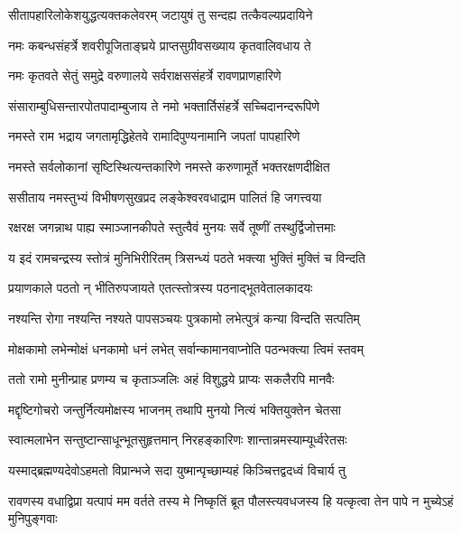 \twolineshloka
{सीतापहारिलोकेशयुद्धत्यक्तकलेवरम्}
{जटायुषं तु सन्दह्य तत्कैवल्यप्रदायिने}%

\twolineshloka
{नमः कबन्धसंहर्त्रे शवरीपूजिताङ्घ्रये}
{प्राप्तसुग्रीवसख्याय कृतवालिवधाय ते}%

\twolineshloka
{नमः कृतवते सेतुं समुद्रे वरुणालये}
{सर्वराक्षससंहर्त्रे रावणप्राणहारिणे}%

\twolineshloka
{संसाराम्बुधिसन्तारपोतपादाम्बुजाय ते}
{नमो भक्तार्तिसंहर्त्रे सच्चिदानन्दरूपिणे}%

\twolineshloka
{नमस्ते राम भद्राय जगतामृद्धिहेतवे}
{रामादिपुण्यनामानि जपतां पापहारिणे}%

\twolineshloka
{नमस्ते सर्वलोकानां सृष्टिस्थित्यन्तकारिणे}
{नमस्ते करुणामूर्ते भक्तरक्षणदीक्षित}%

\twolineshloka
{ससीताय नमस्तुभ्यं विभीषणसुखप्रद}
{लङ्केश्वरवधाद्राम पालितं हि जगत्त्वया}%

\twolineshloka
{रक्षरक्ष जगन्नाथ पाह्य स्माञ्जानकीपते}
{स्तुत्वैवं मुनयः सर्वे तूष्णीं तस्थुर्द्विजोत्तमाः}%


\twolineshloka
{य इदं रामचन्द्रस्य स्तोत्रं मुनिभिरीरितम्}
{त्रिसन्ध्यं पठते भक्त्या भुक्तिं मुक्तिं च विन्दति}%

\twolineshloka
{प्रयाणकाले पठतो न् भीतिरुपजायते}
{एतत्स्तोत्रस्य पठनाद्भूतवेतालकादयः}%

\twolineshloka
{नश्यन्ति रोगा नश्यन्ति नश्यते पापसञ्चयः}
{पुत्रकामो लभेत्पुत्रं कन्या विन्दति सत्पतिम्}%

\twolineshloka
{मोक्षकामो लभेन्मोक्षं धनकामो धनं लभेत्}
{सर्वान्कामानवाप्नोति पठन्भक्त्या त्विमं स्तवम्}%

\twolineshloka
{ततो रामो मुनीन्प्राह प्रणम्य च कृताञ्जलिः}
{अहं विशुद्धये प्राप्यः सकलैरपि मानवैः}%

\twolineshloka
{मद्दृष्टिगोचरो जन्तुर्नित्यमोक्षस्य भाजनम्}
{तथापि मुनयो नित्यं भक्तियुक्तेन चेतसा}%

\twolineshloka
{स्वात्मलाभेन सन्तुष्टान्साधून्भूतसुहृत्तमान्}
{निरहङ्कारिणः शान्तान्नमस्याम्यूर्ध्वरेतसः}%

\twolineshloka
{यस्माद्ब्रह्मण्यदेवोऽहमतो विप्रान्भजे सदा}
{युष्मान्पृच्छाम्यहं किञ्चित्तद्वदध्वं विचार्य तु}%

\threelineshloka
{रावणस्य वधाद्विप्रा यत्पापं मम वर्तते}
{तस्य मे निष्कृतिं ब्रूत पौलस्त्यवधजस्य हि}
{यत्कृत्वा तेन पापे न मुच्येऽहं मुनिपुङ्गवाः}%



